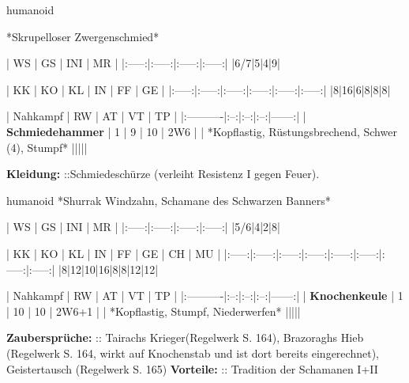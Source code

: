 \label{duglim}
 {{humanoid
 		
 *Skrupelloser Zwergenschmied*


 |  WS  |  GS  |  INI  |  MR | 
 |:-----:|:-----:|:-----:|:-----:|
 |6/7|5|4|9|


 |  KK  |  KO  |  KL  |  IN  |  FF  |  GE  |
 |:-----:|:-----:|:-----:|:-----:|:-----:|:-----:|
 |8|16|6|8|8|8|


 | Nahkampf  | RW | AT | VT | TP    |
 |:----------|:--:|:--:|:--:|------:|
 | \textbf{Schmiedehammer} | 1  | 9 | 10 | 2W6 |
 | *Kopflastig, Rüstungsbrechend, Schwer (4), Stumpf* |||||


 \textbf{Kleidung:} ::Schmiedeschürze (verleiht Resistenz I gegen Feuer).


 }}


 {{humanoid
 *Shurrak Windzahn, Schamane des Schwarzen Banners*


 |  WS  |  GS  |  INI  |  MR | 
 |:-----:|:-----:|:-----:|:-----:|
 |5/6|4|2|8|


 |  KK  |  KO  |  KL  |  IN  |  FF  |  GE  |  CH  |  MU  |
 |:-----:|:-----:|:-----:|:-----:|:-----:|:-----:|:-----:|:-----:|
 |8|12|10|16|8|8|12|12|


 | Nahkampf  | RW | AT | VT | TP    |
 |:----------|:--:|:--:|:--:|------:|
 | \textbf{Knochenkeule} | 1  | 10 | 10 | 2W6+1 |
 | *Kopflastig, Stumpf, Niederwerfen* |||||


 \textbf{Zaubersprüche:} :: Tairachs Krieger(Regelwerk S. 164), Brazoraghs Hieb (Regelwerk S. 164, wirkt auf Knochenstab und ist dort bereits eingerechnet), Geistertausch (Regelwerk S. 165)
 \textbf{Vorteile:} :: Tradition der Schamanen I+II


 }}





\label{kuh_ho1}

